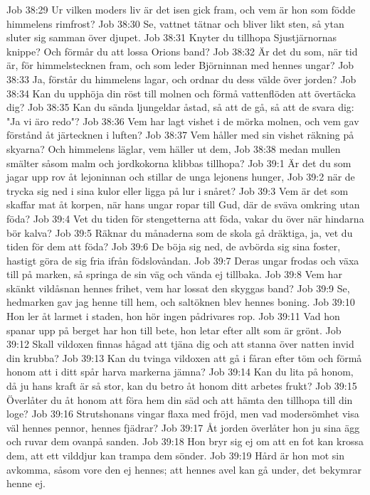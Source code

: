 Job 38:29  Ur vilken moders liv är det isen gick fram, och vem är hon som födde himmelens rimfrost?
Job 38:30  Se, vattnet tätnar och bliver likt sten, så ytan sluter sig samman över djupet.
Job 38:31  Knyter du tillhopa Sjustjärnornas knippe? Och förmår du att lossa Orions band?
Job 38:32  Är det du som, när tid är, för himmelstecknen fram, och som leder Björninnan med hennes ungar?
Job 38:33  Ja, förstår du himmelens lagar, och ordnar du dess välde över jorden?
Job 38:34  Kan du upphöja din röst till molnen och förmå vattenflöden att övertäcka dig?
Job 38:35  Kan du sända ljungeldar åstad, så att de gå, så att de svara dig: "Ja vi äro redo"?
Job 38:36  Vem har lagt vishet i de mörka molnen, och vem gav förstånd åt järtecknen i luften?
Job 38:37  Vem håller med sin vishet räkning på skyarna? Och himmelens läglar, vem häller ut dem,
Job 38:38  medan mullen smälter såsom malm och jordkokorna klibbas tillhopa?
Job 39:1  Är det du som jagar upp rov åt lejoninnan och stillar de unga lejonens hunger,
Job 39:2  när de trycka sig ned i sina kulor eller ligga på lur i snåret?
Job 39:3  Vem är det som skaffar mat åt korpen, när hans ungar ropar till Gud, där de sväva omkring utan föda?
Job 39:4  Vet du tiden för stengetterna att föda, vakar du över när hindarna bör kalva?
Job 39:5  Räknar du månaderna som de skola gå dräktiga, ja, vet du tiden för dem att föda?
Job 39:6  De böja sig ned, de avbörda sig sina foster, hastigt göra de sig fria ifrån födslovåndan.
Job 39:7  Deras ungar frodas och växa till på marken, så springa de sin väg och vända ej tillbaka.
Job 39:8  Vem har skänkt vildåsnan hennes frihet, vem har lossat den skyggas band?
Job 39:9  Se, hedmarken gav jag henne till hem, och saltöknen blev hennes boning.
Job 39:10  Hon ler åt larmet i staden, hon hör ingen pådrivares rop.
Job 39:11  Vad hon spanar upp på berget har hon till bete, hon letar efter allt som är grönt.
Job 39:12  Skall vildoxen finnas hågad att tjäna dig och att stanna över natten invid din krubba?
Job 39:13  Kan du tvinga vildoxen att gå i fåran efter töm och förmå honom att i ditt spår harva markerna jämna?
Job 39:14  Kan du lita på honom, då ju hans kraft är så stor, kan du betro åt honom ditt arbetes frukt?
Job 39:15  Överlåter du åt honom att föra hem din säd och att hämta den tillhopa till din loge?
Job 39:16  Strutshonans vingar flaxa med fröjd, men vad modersömhet visa väl hennes pennor, hennes fjädrar?
Job 39:17  Åt jorden överlåter hon ju sina ägg och ruvar dem ovanpå sanden.
Job 39:18  Hon bryr sig ej om att en fot kan krossa dem, att ett vilddjur kan trampa dem sönder.
Job 39:19  Hård är hon mot sin avkomma, såsom vore den ej hennes; att hennes avel kan gå under, det bekymrar henne ej.
